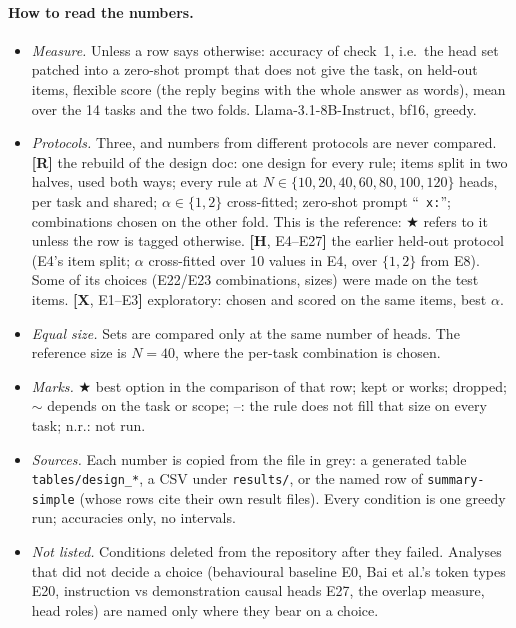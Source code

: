 \documentclass[10pt,a4paper]{article}
\newcommand{\best}{\textcolor{blue!65!black}{$\bigstar$}}
\newcommand{\yes}{\textcolor{green!45!black}{\ding{51}}}
\newcommand{\no}{\textcolor{red!70!black}{\ding{55}}}
\newcommand{\mixed}{\textcolor{orange!80!black}{$\sim$}}
\newcommand{\tR}{\textsf{\textbf{[R]}}}
\newcommand{\tH}[1]{\textsf{\textbf{[H}, #1\textbf{]}}}
\newcommand{\tX}[1]{\textsf{\textbf{[X}, #1\textbf{]}}}
\newcommand{\p}[1]{``\texttt{#1}''}
\begin{document}
\paragraph{How to read the numbers.}
\begin{itemize}
\item \emph{Measure.} Unless a row says otherwise: accuracy of check~1, i.e.\ the head set patched into a zero-shot prompt that does not give the task, on held-out items, flexible score (the reply begins with the whole answer as words), mean over the 14 tasks and the two folds. Llama-3.1-8B-Instruct, bf16, greedy.
\item \emph{Protocols.} Three, and numbers from different protocols are never compared.
\tR{} the rebuild of the design doc: one design for every rule; items split in two halves, used both ways; every rule at $N\in\{10,20,40,60,80,100,120\}$ heads, per task and shared; $\alpha\in\{1,2\}$ cross-fitted; zero-shot prompt \p{ x:}; combinations chosen on the other fold. This is the reference: \best{} refers to it unless the row is tagged otherwise.
\tH{E4--E27} the earlier held-out protocol (E4's item split; $\alpha$ cross-fitted over 10 values in E4, over $\{1,2\}$ from E8). Some of its choices (E22/E23 combinations, sizes) were made on the test items.
\tX{E1--E3} exploratory: chosen and scored on the same items, best $\alpha$.
\item \emph{Equal size.} Sets are compared only at the same number of heads. The reference size is $N=40$, where the per-task combination is chosen.
\item \emph{Marks.} \best{} best option in the comparison of that row; \yes{} kept or works; \no{} dropped; \mixed{} depends on the task or scope; --: the rule does not fill that size on every task; n.r.: not run.
\item \emph{Sources.} Each number is copied from the file in grey: a generated table \texttt{tables/design\_*}, a CSV under \texttt{results/}, or the named row of \texttt{summary-simple} (whose rows cite their own result files). Every condition is one greedy run; accuracies only, no intervals.
\item \emph{Not listed.} Conditions deleted from the repository after they failed. Analyses that did not decide a choice (behavioural baseline E0, Bai et al.'s token types E20, instruction vs demonstration causal heads E27, the overlap measure, head roles) are named only where they bear on a choice.
\end{itemize}

\end{document}
